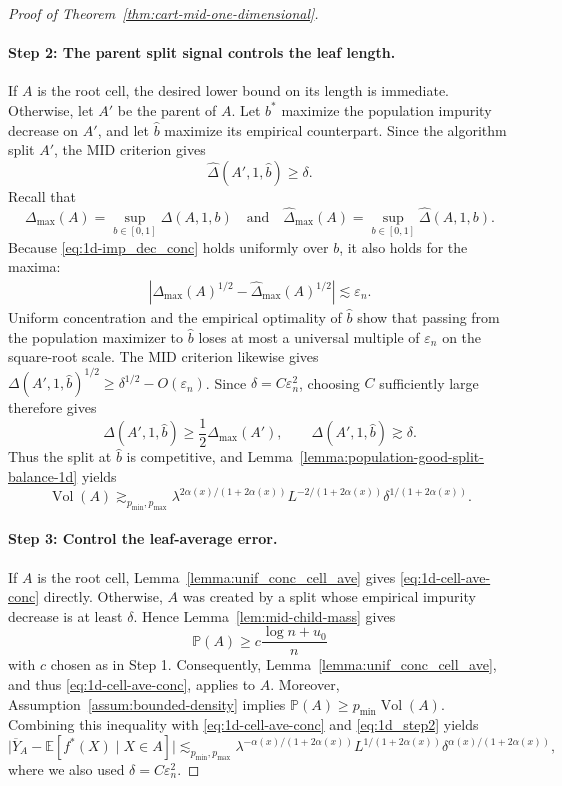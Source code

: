 \documentclass[11pt]{article}
\theoremstyle{plain}
\theoremstyle{definition}
\theoremstyle{remark}
\theoremstyle{plain}
\renewcommand{\P}{\mathbb{P}}
\newcommand{\E}{\mathbb{E}}
\DeclareMathOperator{\Vol}{Vol}
\newcommand{\1}{\mathbbm{1}}
\begin{document}
\begin{proof}[Proof of Theorem~\ref{thm:cart-mid-one-dimensional}]
\paragraph{Step 2: The parent split signal controls the leaf length.}
If $A$ is the root cell, the desired lower bound on its length is
immediate. Otherwise, let $A'$ be the parent of $A$. Let $b^*$ maximize
the population impurity decrease on $A'$, and let $\hat b$ maximize its
empirical counterpart. Since the algorithm split $A'$, the MID
criterion gives
\[
\widehat\Delta(A',1,\hat b)\ge\delta.
\]
Recall that
\[
\Delta_{\max}(A)=\sup_{b\in[0,1]}\Delta(A,1,b)
\quad\text{and}\quad
\widehat\Delta_{\max}(A)=
\sup_{b\in[0,1]}\widehat\Delta(A,1,b).
\]
Because \eqref{eq:1d-imp_dec_conc} holds uniformly over $b$, it also
holds for the maxima:
\begin{align}\label{eq::conc-max-id}
\left|
\Delta_{\max}(A)^{1/2}
-
\widehat\Delta_{\max}(A)^{1/2}
\right|
\lesssim \varepsilon_n .
\end{align}
Uniform concentration and the empirical optimality of $\hat b$ show
that passing from the population maximizer to $\hat b$ loses at most a
universal multiple of $\varepsilon_n$ on the square-root scale. The MID
criterion likewise gives
$\Delta(A',1,\hat b)^{1/2}\ge\delta^{1/2}-O(\varepsilon_n)$.
Since $\delta=C\varepsilon_n^2$, choosing $C$ sufficiently large therefore
gives
\[
\Delta(A',1,\hat b)
\ge \frac{1}{2}\Delta_{\max}(A'),
\qquad
\Delta(A',1,\hat b)\gtrsim\delta.
\]
Thus the split at $\hat b$ is competitive, and
Lemma~\ref{lemma:population-good-split-balance-1d} yields
\begin{equation} \label{eq:1d_step2}
\Vol(A)
\gtrsim_{p_{\min},p_{\max}}
\lambda^{2\alpha(x)/(1+2\alpha(x))}
L^{-2/(1+2\alpha(x))}
\delta^{1/(1+2\alpha(x))}.
\end{equation}

\paragraph{Step 3: Control the leaf-average error.}
If $A$ is the root cell, Lemma~\ref{lemma:unif_conc_cell_ave} gives
\eqref{eq:1d-cell-ave-conc} directly. Otherwise, $A$ was created by a split
whose empirical impurity decrease is at least $\delta$. Hence
Lemma~\ref{lem:mid-child-mass} gives
\[
\P(A)\ge c\frac{\log n+u_0}{n}
\]
with $c$ chosen as in Step 1. Consequently,
Lemma~\ref{lemma:unif_conc_cell_ave}, and thus
\eqref{eq:1d-cell-ave-conc}, applies to $A$. Moreover,
Assumption~\ref{assum:bounded-density} implies
$\P(A) \geq p_{\min}\Vol(A)$.
Combining this inequality with \eqref{eq:1d-cell-ave-conc} and
\eqref{eq:1d_step2} yields
\[
\bigl|\overline Y_A-\E[f^*(X)\mid X\in A]\bigr|
\lesssim_{p_{\min},p_{\max}}
\lambda^{-\alpha(x)/(1+2\alpha(x))}
L^{1/(1+2\alpha(x))}
\delta^{\alpha(x)/(1+2\alpha(x))},
\]
where we also used $\delta=C\varepsilon_n^2$.


\end{proof}
\end{document}
